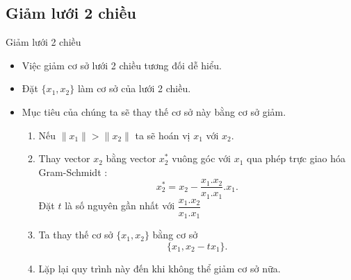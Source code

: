 \documentclass{beamer}
\numberwithin{equation}{section}
\begin{document}
\subsection{Giảm lưới 2 chiều}
\begin{frame}{Giảm lưới 2 chiều}
\begin{itemize}
\item Việc giảm cơ sở lưới 2 chiều tương đối dễ hiểu.
\item Đặt $\{x_1, x_2\}$ làm cơ sở của lưới 2 chiều.
\item Mục tiêu của chúng ta sẽ thay thế cơ sở này bằng cơ sở giảm.
\begin{enumerate}
\item Nếu $\|x_1\| > \|x_2\|$ ta sẽ hoán vị $x_1$ với $x_2$.
\item Thay vector $x_2$ bằng vector $x_2^*$ vuông góc với $x_1$ qua phép trực giao hóa Gram-Schmidt :
$$x_2^* = x_2 - \frac{x_1.x_2}{x_1.x_1}.x_1 \text{.}$$ Đặt $t$ là số nguyên gần nhất với $\dfrac{x_1.x_2}{x_1.x_1}$
\item Ta thay thế cơ sở $\{x_1, x_2 \}$ bằng cơ sở $$\{x_1, x_2 - tx_1\}\text{.}$$
\item Lặp lại quy trình này đến khi không thể giảm cơ sở nữa.
\end{enumerate}
\end{itemize}
\end{frame}

  















\end{document}
